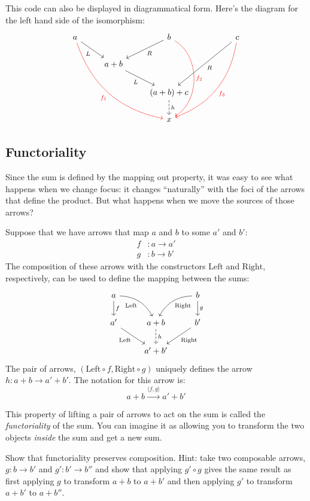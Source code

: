 \documentclass[DaoFP]{subfiles}
\begin{document}
This code can also be displayed in diagrammatical form. Here's the diagram for the left hand side of the isomorphism:
\[
 \begin{tikzcd}
 a
 \arrow[rd, "L"']
 \arrow[rrddd, bend right, red, "f_1"']
 && b
 \arrow[ld, "R"]
 \arrow[ddd, bend left=60, red, "f_2"]
&&c
 \arrow[lldd, "R"]
 \arrow[llddd, bend left, red, "f_3"]
 \\
 & a + b
  \arrow[rd, "L"']
 \\
&&(a + b) + c
 \arrow[d, dashed, "h"]
\\
&& x
 \end{tikzcd}
\]
\subsection{Functoriality}
Since the sum is defined by the mapping out property, it was easy to see what happens when we change focus: it changes ``naturally'' with the foci of the arrows that define the product. But what happens when we move the sources of those arrows? 

Suppose that we have arrows that map $a$ and $b$ to some $a'$ and $b'$:
\begin{align*}f &\colon a \to a' \\
g &\colon b \to b' 
\end{align*}
The composition of these arrows with the constructors $\text{Left}$ and $\text{Right}$, respectively, can be used to define the mapping between the sums:
\[
 \begin{tikzcd}
 a
 \arrow[d, "f"]
 \arrow[dr,  bend left, "\text{Left}"']
  && b
 \arrow[d, "g"]
 \arrow[dl, bend right, "\text{Right}"]
 \\
 a'
 \arrow[rd, "\text{Left}"']
&a + b
\arrow[d, dashed, "h"]
& b'
\arrow[ld, "\text{Right}"]
\\
& a' + b'
 \end{tikzcd}
\]
The pair of arrows, $(\text{Left} \circ f, \text{Right} \circ g)$ uniquely defines the arrow $h \colon a + b \to a' + b'$. The notation for this arrow is:
\[ a + b \xrightarrow{\langle f, g \rangle} a' + b' \]

This property of lifting a pair of arrows to act on the sum is called the \emph{functoriality} of the sum. You can imagine it as allowing you to transform the two objects \emph{inside} the sum and get a new sum. 
\begin{exercise}
Show that functoriality preserves composition. Hint: take two composable arrows, $g \colon b \to b'$ and $g' \colon b' \to b''$ and show that applying $g' \circ g$ gives the same result as first applying $g$ to transform $a + b$ to $a + b'$ and then applying $g'$ to transform $a + b'$ to $a + b''$.
\end{exercise}
\end{document}
